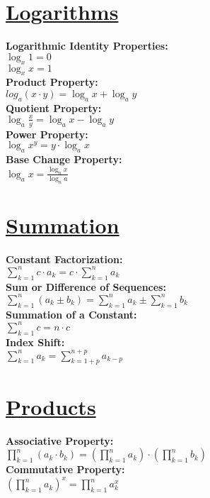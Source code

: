 \documentclass[12pt]{article}
\begin{document}
\section*{\underline{\textbf{Logarithms}}}
\textbf{Logarithmic Identity Properties:}
    \\ \( \log_x{1} = 0 \)
    \\ \( \log_x{x} = 1 \)
\\ \textbf{Product Property:}
    \\ \( log_a{(x \cdot y)} = \log_a{x} + \log_a{y} \)
\\ \textbf{Quotient Property:}
    \\ \( \log_a{\displaystyle\frac{ x }{ y }} = \log_a{x} - \log_a{y} \)
\\ \textbf{Power Property:}
    \\ \( \log_a{x^y} = y \cdot \log_a{x} \)
\\ \textbf{Base Change Property:}
    \\ \( \log_a{x} = \displaystyle\frac{ \log_n{x} }{ \log_n{a} } \)



\section*{\underline{\textbf{Summation}}}
\textbf{Constant Factorization:}
    \\ \( \displaystyle\sum_{k=1}^{n} {c \cdot a_k } = c \cdot \displaystyle\sum_{k=1}^{n} { a_k } \)
\\ \textbf{Sum or Difference of Sequences:}
    \\ \( \displaystyle\sum_{k = 1}^{n} {(a_k \pm b_k)} = \displaystyle\sum_{k = 1}^{n} {a_k} \pm \displaystyle\sum_{k = 1}^{n} {b_k} \)
\\ \textbf{Summation of a Constant:}
    \\ \( \displaystyle\sum_{k = 1}^{n} {c} = n \cdot c \)
\\ \textbf{Index Shift:}
    \\ \( \displaystyle\sum_{k = 1}^{n} {a_k} = \displaystyle\sum_{k = 1 + p}^{n + p} {a_{k-p}} \)



\section*{\underline{\textbf{Products}}}
\textbf{Associative Property:}
    \\ \( \displaystyle\prod_{k = 1}^{n} {(a_k \cdot b_k)} = \left( \displaystyle\prod_{k = 1}^{n} {a_k} \right) \cdot \left( \displaystyle\prod_{k = 1}^{n} {b_k} \right) \)
\\ \textbf{Commutative Property:}
    \\ \( \left( \displaystyle\prod_{k = 1}^{n} {a_k} \right)^x = \displaystyle\prod_{k = 1}^{n} {a_k^x} \)
\end{document}
